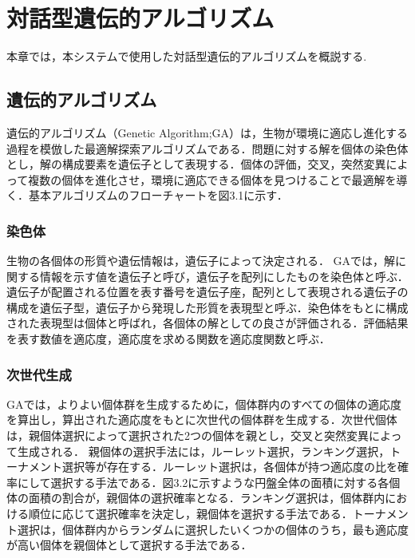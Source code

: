 \chapter{対話型遺伝的アルゴリズム}
本章では，本システムで使用した対話型遺伝的アルゴリズムを概説する.
\section{遺伝的アルゴリズム}
遺伝的アルゴリズム（Genetic Algorithm;GA）は，生物が環境に適応し進化する過程を模倣した最適解探索アルゴリズムである．問題に対する解を個体の染色体とし，解の構成要素を遺伝子として表現する．個体の評価，交叉，突然変異によって複数の個体を進化させ，環境に適応できる個体を見つけることで最適解を導く．基本アルゴリズムのフローチャートを図3.1に示す．

\subsection{染色体}
生物の各個体の形質や遺伝情報は，遺伝子によって決定される．
GAでは，解に関する情報を示す値を遺伝子と呼び，遺伝子を配列にしたものを染色体と呼ぶ．
遺伝子が配置される位置を表す番号を遺伝子座，配列として表現される遺伝子の構成を遺伝子型，遺伝子から発現した形質を表現型と呼ぶ．染色体をもとに構成された表現型は個体と呼ばれ，各個体の解としての良さが評価される．評価結果を表す数値を適応度，適応度を求める関数を適応度関数と呼ぶ．

\subsection{次世代生成}
GAでは，よりよい個体群を生成するために，個体群内のすべての個体の適応度を算出し，算出された適応度をもとに次世代の個体群を生成する．次世代個体は，親個体選択によって選択された2つの個体を親とし，交叉と突然変異によって生成される．
親個体の選択手法には，ルーレット選択，ランキング選択，トーナメント選択等が存在する．ルーレット選択は，各個体が持つ適応度の比を確率にして選択する手法である．図3.2に示すような円盤全体の面積に対する各個体の面積の割合が，親個体の選択確率となる．ランキング選択は，個体群内における順位に応じて選択確率を決定し，親個体を選択する手法である．トーナメント選択は，個体群内からランダムに選択したいくつかの個体のうち，最も適応度が高い個体を親個体として選択する手法である．

